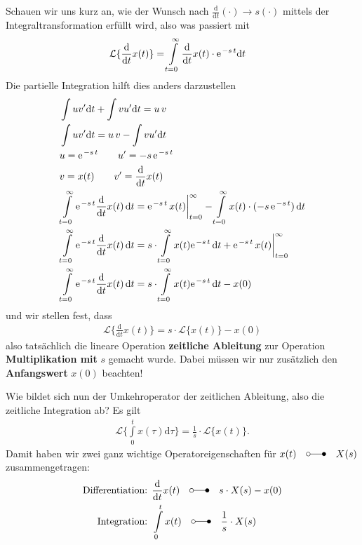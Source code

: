 \documentclass[11pt,a4paper,DIV=12]{scrartcl}
\numberwithin{equation}{section}
\numberwithin{figure}{section}
\newcommand\fsd{\mathrm{d}} %
\begin{document}
Schauen wir uns kurz an, wie der Wunsch nach
$\frac{\fsd }{\fsd t} (\cdot) \rightarrow s(\cdot )$
mittels der Integraltransformation erfüllt wird, also was passiert mit
\begin{align}
\mathcal{L}\{\frac{\fsd }{\fsd t}  x(t)\} &= \int\limits_{t=0}^{\infty} \frac{\fsd }{\fsd t}  x(t) \cdot \e^{-s\,t} \fsd t
\end{align}
Die partielle Integration hilft dies anders darzustellen
\begin{align}
&\int u v' \fsd t + \int v u' \fsd t = u\,v\\
&\int u v' \fsd t = u\,v - \int v u' \fsd t\\
&u = \e^{-s\,t}\qquad u' = -s\,\e^{-s\,t}\\
&v = x(t)\qquad v' = \frac{\fsd }{\fsd t}  x(t)\\
&\int\limits_{t=0}^{\infty} \e^{-s\,t} \frac{\fsd }{\fsd t}  x(t) \, \fsd t
= \e^{-s\,t}\,x(t)\bigg|_{t=0}^{\infty} - \int\limits_{t=0}^{\infty} x(t) \cdot (-s\,\e^{-s\,t}) \, \fsd t\\
&\int\limits_{t=0}^{\infty} \e^{-s\,t} \frac{\fsd }{\fsd t}  x(t) \, \fsd t
= s \cdot \int\limits_{t=0}^{\infty} x(t) \e^{-s\,t} \, \fsd t
+\e^{-s\,t}\,x(t)\bigg|_{t=0}^{\infty}\\
&\int\limits_{t=0}^{\infty} \e^{-s\,t} \frac{\fsd }{\fsd t}  x(t) \, \fsd t
= s \cdot \int\limits_{t=0}^{\infty} x(t) \e^{-s\,t} \, \fsd t - x(0)
\end{align}
und wir stellen fest, dass
\begin{align}
\mathcal{L}\{\frac{\fsd }{\fsd t}  x(t)\}  = s \cdot \mathcal{L}\{x(t)\} - x(0)
\end{align}
also tatsächlich die lineare Operation \textbf{zeitliche Ableitung} zur Operation
\textbf{Multiplikation mit} $s$ gemacht wurde. Dabei müssen wir nur zusätzlich den
\textbf{Anfangswert} $x(0)$ beachten!

Wie bildet sich nun der Umkehroperator der zeitlichen Ableitung, also die zeitliche
Integration ab? Es gilt
\begin{align}
\mathcal{L}\{\int\limits_{0}^{t} x(\tau)\fsd \tau\}  = \frac{1}{s} \cdot \mathcal{L}\{x(t)\}.
\end{align}
Damit haben wir zwei ganz wichtige Operatoreigenschaften für
$x(t)\quad\laplace\quad X(s)$ zusammengetragen:
\begin{align}
\text{Differentiation:   } &\frac{\fsd }{\fsd t}  x(t) \quad\laplace\quad s\cdot X(s) - x(0)\\
\text{Integration:   } &\int\limits_{0}^{t} x(t) \quad\laplace\quad \frac{1}{s} \cdot X(s)
\end{align}
\end{document}

